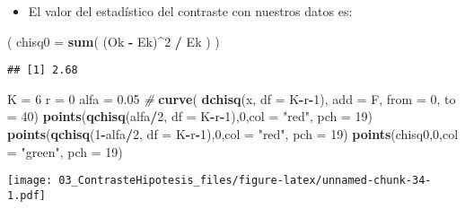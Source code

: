 \documentclass[]{article}
\newenvironment{Shaded}{\begin{snugshade}}{\end{snugshade}}
\newcommand{\KeywordTok}[1]{\textcolor[rgb]{0.13,0.29,0.53}{\textbf{#1}}}
\newcommand{\DataTypeTok}[1]{\textcolor[rgb]{0.13,0.29,0.53}{#1}}
\newcommand{\DecValTok}[1]{\textcolor[rgb]{0.00,0.00,0.81}{#1}}
\newcommand{\FloatTok}[1]{\textcolor[rgb]{0.00,0.00,0.81}{#1}}
\newcommand{\StringTok}[1]{\textcolor[rgb]{0.31,0.60,0.02}{#1}}
\newcommand{\CommentTok}[1]{\textcolor[rgb]{0.56,0.35,0.01}{\textit{#1}}}
\newcommand{\OperatorTok}[1]{\textcolor[rgb]{0.81,0.36,0.00}{\textbf{#1}}}
\newcommand{\NormalTok}[1]{#1}
\providecommand{\tightlist}{%
  \setlength{\itemsep}{0pt}\setlength{\parskip}{0pt}}
\begin{document}
\begin{itemize}
\tightlist
\item
  El valor del estadístico del contraste con nuestros datos es:
\end{itemize}

\begin{Shaded}
\begin{Highlighting}[]
\NormalTok{( }\DataTypeTok{chisq0 =} \KeywordTok{sum}\NormalTok{( (Ok }\OperatorTok{-}\StringTok{ }\NormalTok{Ek)}\OperatorTok{^}\DecValTok{2} \OperatorTok{/}\StringTok{ }\NormalTok{Ek ) )}
\end{Highlighting}
\end{Shaded}

\begin{verbatim}
## [1] 2.68
\end{verbatim}

\begin{Shaded}
\begin{Highlighting}[]
\NormalTok{K =}\StringTok{ }\DecValTok{6}
\NormalTok{r =}\StringTok{ }\DecValTok{0}
\NormalTok{alfa =}\StringTok{ }\FloatTok{0.05}
\CommentTok{#}
\KeywordTok{curve}\NormalTok{( }\KeywordTok{dchisq}\NormalTok{(x, }\DataTypeTok{df =}\NormalTok{ K}\OperatorTok{-}\NormalTok{r}\OperatorTok{-}\DecValTok{1}\NormalTok{), }\DataTypeTok{add =}\NormalTok{ F, }\DataTypeTok{from =} \DecValTok{0}\NormalTok{, }\DataTypeTok{to =} \DecValTok{40}\NormalTok{)}
\KeywordTok{points}\NormalTok{(}\KeywordTok{qchisq}\NormalTok{(alfa}\OperatorTok{/}\DecValTok{2}\NormalTok{, }\DataTypeTok{df =}\NormalTok{ K}\OperatorTok{-}\NormalTok{r}\OperatorTok{-}\DecValTok{1}\NormalTok{),}\DecValTok{0}\NormalTok{,}\DataTypeTok{col =} \StringTok{"red"}\NormalTok{, }\DataTypeTok{pch =} \DecValTok{19}\NormalTok{)}
\KeywordTok{points}\NormalTok{(}\KeywordTok{qchisq}\NormalTok{(}\DecValTok{1}\OperatorTok{-}\NormalTok{alfa}\OperatorTok{/}\DecValTok{2}\NormalTok{, }\DataTypeTok{df =}\NormalTok{ K}\OperatorTok{-}\NormalTok{r}\OperatorTok{-}\DecValTok{1}\NormalTok{),}\DecValTok{0}\NormalTok{,}\DataTypeTok{col =} \StringTok{"red"}\NormalTok{, }\DataTypeTok{pch =} \DecValTok{19}\NormalTok{)}
\KeywordTok{points}\NormalTok{(chisq0,}\DecValTok{0}\NormalTok{,}\DataTypeTok{col =} \StringTok{"green"}\NormalTok{, }\DataTypeTok{pch =} \DecValTok{19}\NormalTok{)}
\end{Highlighting}
\end{Shaded}

\texttt{[image: 03\_ContrasteHipotesis\_files/figure-latex/unnamed-chunk-34-1.pdf]}
\end{document}
